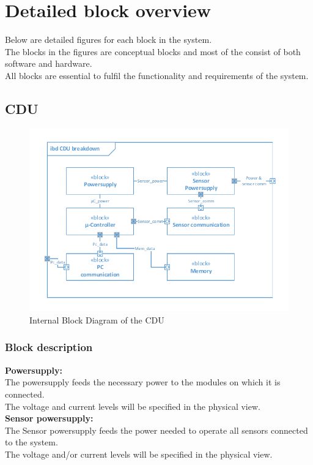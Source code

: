 \section{Detailed block overview}
Below are detailed figures for each block in the system.\\
The blocks in the figures are conceptual blocks and most of the consist of both software and hardware.\\
All blocks are essential to fulfil the functionality and requirements of the system.

\subsection{CDU}

\begin{figure}[hbpt]
\centering
\includegraphics[width=.8\textwidth]{billeder/CDU_IBD}
\caption{Internal Block Diagram of the CDU}
\label{CDU_IBD}
\end{figure}

\subsubsection{Block description}

\textbf{Powersupply:}\\
The powersupply feeds the necessary power to the modules on which it is connected.\\
The voltage and current levels will be specified in the physical view.\\

\textbf{Sensor powersupply:}\\
The Sensor powersupply feeds the power needed to operate all sensors connected to the system.\\
The voltage and/or current levels will be specified in the physical view.\\

